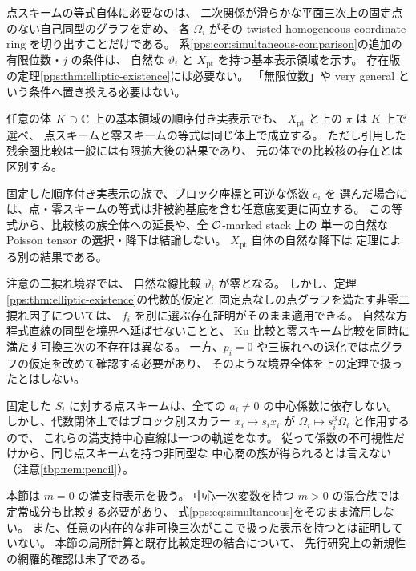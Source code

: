 \begin{remark}[表示・体・族に関する範囲]
\label{pps:rem:scope}
点スキームの等式自体に必要なのは、
二次関係が滑らかな平面三次上の固定点のない自己同型のグラフを定め、
各 $\Omega_i$ がその twisted homogeneous coordinate ring を切り出すことだけである。
系\ref{pps:cor:simultaneous-comparison}の追加の有限位数・$j$ の条件は、
自然な $\vartheta_i$ と $X_{\mathrm{pt}}$ を持つ基本表示領域を示す。
存在版の定理\ref{pps:thm:elliptic-existence}には必要ない。
「無限位数」や very general という条件へ置き換える必要はない。

任意の体 $K\supset\mathbb C$ 上の基本領域の順序付き実表示でも、
$X_{\mathrm{pt}}$ と上の $\pi$ は $K$ 上で選べ、
点スキームと零スキームの等式は同じ体上で成立する。
ただし引用した残余圏比較は一般には有限拡大後の結果であり、
元の体での比較核の存在とは区別する。

固定した順序付き実表示の族で、ブロック座標と可逆な係数 $c_i$ を
選んだ場合には、点・零スキームの等式は非被約基底を含む任意底変更に両立する。
この等式から、比較核の族全体への延長や、全 $\mathcal O$-marked stack 上の
単一の自然な Poisson tensor の選択・降下は結論しない。
$X_{\mathrm{pt}}$ 自体の自然な降下は
定理による別の結果である。

注意の二捩れ境界では、
自然な線比較 $\vartheta_i$ が零となる。
しかし、定理\ref{pps:thm:elliptic-existence}の代数的仮定と
固定点なしの点グラフを満たす非零二捩れ因子については、
$f_i$ を別に選ぶ存在証明がそのまま適用できる。
自然な方程式直線の同型を境界へ延ばせないことと、
Ku 比較と零スキーム比較を同時に満たす可換三次の不存在は異なる。
一方、$p_i=0$ や三捩れへの退化では点グラフの仮定を改めて確認する必要があり、
そのような境界全体を上の定理で扱ったとはしない。
\end{remark}

\begin{remark}[中心係数と未解決部分]
\label{pps:rem:coefficients}
固定した $S_i$ に対する点スキームは、全ての $a_i\ne0$ の中心係数に依存しない。
しかし、代数閉体上ではブロック別スカラー $x_i\mapsto s_ix_i$ が
$\Omega_i\mapsto s_i^3\Omega_i$ と作用するので、
これらの満支持中心直線は一つの軌道をなす。
従って係数の不可視性だけから、同じ点スキームを持つ非同型な
中心商の族が得られるとは言えない
（注意\ref{tbp:rem:pencil}）。

本節は $m=0$ の満支持表示を扱う。
中心一次変数を持つ $m>0$ の混合族では定常成分も比較する必要があり、
式\eqref{pps:eq:simultaneous}をそのまま流用しない。
また、任意の内在的な非可換三次がここで扱った表示を持つとは証明していない。
本節の局所計算と既存比較定理の結合について、
先行研究上の新規性の網羅的確認は未了である。
\end{remark}
